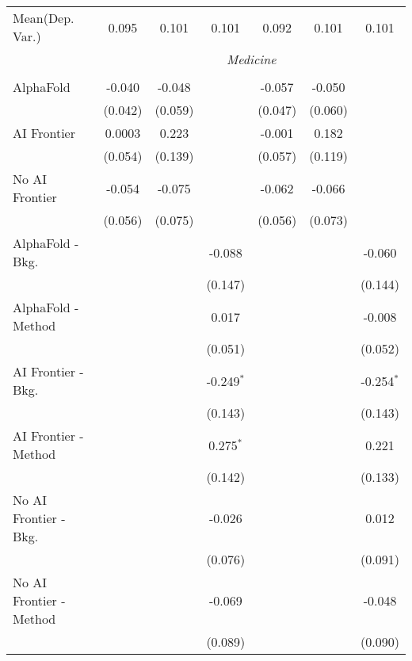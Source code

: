 \begin{tabular}{lcccccc}
Mean(Dep. Var.) & 0.095 & 0.101 & 0.101 & 0.092 & 0.101 & 0.101 \\
 & \multicolumn{6}{c}{\textit{Medicine}} \\ \\
   AlphaFold               & -0.040  & -0.048  &              & -0.057  & -0.050  &   \\   
                           & (0.042) & (0.059) &              & (0.047) & (0.060) &   \\   
   AI Frontier             & 0.0003  & 0.223   &              & -0.001  & 0.182   &   \\   
                           & (0.054) & (0.139) &              & (0.057) & (0.119) &   \\   
   No AI Frontier          & -0.054  & -0.075  &              & -0.062  & -0.066  &   \\   
                           & (0.056) & (0.075) &              & (0.056) & (0.073) &   \\   
   AlphaFold - Bkg.        &         &         & -0.088       &         &         & -0.060\\   
                           &         &         & (0.147)      &         &         & (0.144)\\   
   AlphaFold - Method      &         &         & 0.017        &         &         & -0.008\\   
                           &         &         & (0.051)      &         &         & (0.052)\\   
   AI Frontier - Bkg.      &         &         & -0.249$^{*}$ &         &         & -0.254$^{*}$\\   
                           &         &         & (0.143)      &         &         & (0.143)\\   
   AI Frontier - Method    &         &         & 0.275$^{*}$  &         &         & 0.221\\   
                           &         &         & (0.142)      &         &         & (0.133)\\   
   No AI Frontier - Bkg.   &         &         & -0.026       &         &         & 0.012\\   
                           &         &         & (0.076)      &         &         & (0.091)\\   
   No AI Frontier - Method &         &         & -0.069       &         &         & -0.048\\   
                           &         &         & (0.089)      &         &         & (0.090)\\   

\end{tabular}
